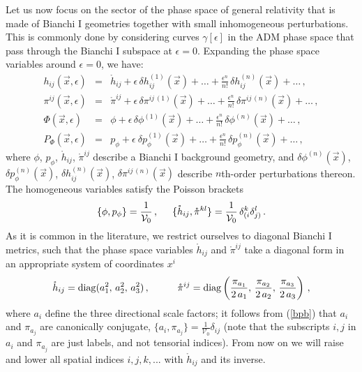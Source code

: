 \documentclass[11pt,tightenlines,eqsecnum,floats,aps,amsmath,amssymb,nofootinbib,prd,floatfix]{revtex4}
\def\f{\frac}
\def\pp{p_{\phi}}
\def\dpp{\delta p_{\phi}}
\def\pz{\mathring{\pi}}
\def\dph{\delta\phi}
\newcommand{\be}{\nopagebreak[3]\begin{equation}}
\newcommand{\ee}{\end{equation}}
\def\hz{\mathring{h}}
\newcommand{\bea}{\nopagebreak[3]\begin{eqnarray}}
\newcommand{\ea}{\end{eqnarray}}
\newcommand{\<}{\langle}
\renewcommand{\>}{\rangle}
\begin{document}
Let us now focus on the sector of the phase space of general relativity that is made of Bianchi I geometries together with small inhomogeneous perturbations. This  is commonly done by considering  curves $\gamma[\epsilon]$ in the ADM  phase space that pass through the Bianchi I subspace at $\epsilon=0$. Expanding the phase space variables around $\epsilon=0$, we have: 
%
\bea \label{expan} h_{ij}(\vec{x},\epsilon) &=& \hz_{ij} + \epsilon\,
\delta h^{(1)}_{ij}(\vec{x}) + \ldots + \f{\epsilon^n}{n!}\, 
\delta h_{ij}^{(n)}(\vec{x}) + \ldots\, ,
\nonumber\\
\pi^{ij}(\vec{x},\epsilon)&=&\pz^{ij}+\epsilon\,
\delta \pi^{ij\, (1)}(\vec{x}) + \ldots + \f{\epsilon^n}{n!}\, 
\delta\pi^{ij\, (n)}(\vec{x}) + \ldots\, , \nonumber \\
\Phi(\vec{x},\epsilon) &=& \phi + \epsilon\, \dph^{(1)}(\vec{x}) + \ldots  + \f{\epsilon^n}{n!}\,\dph^{(n)}(\vec{x}) + \ldots\, , \nonumber \\
P_{\Phi}(\vec{x},\epsilon)&=&\pp+\epsilon\ \dpp^{(1)}(\vec{x})+ \ldots+\f{\epsilon^n}{n!}\,\dpp^{(n)}(\vec{x}) + \ldots\, ,
 \ea
%
where $\phi$, $\pp$, $\hz_{ij}$, $\pz^{ij}$ describe a Bianchi I background geometry,  and $\dph^{(n)}(\vec{x})$, $\dpp^{(n)}(\vec{x})$, $\delta h^{(n)}_{ij}(\vec{x})$, $\delta \pi^{ij\, (n)}(\vec{x})$ describe  $n$th-order perturbations thereon.  The homogeneous variables satisfy the  Poisson brackets
%
\be \label{bpb}  \{\phi, \pp\}=\frac{1}{\mathcal{V}_0}\, ,  \hspace{0.5cm} \{\hz_{ij}, \pz^{kl} \}=\frac{1}{\mathcal{V}_0} \, \delta_{(i}^k\delta_{j)}^{l}\, .\ee 
%
As it is common in the literature, we restrict ourselves to diagonal Bianchi I metrics, such that the phase space variables $\hz_{ij}$ and $\pz^{ij}$ take a diagonal form in an appropriate system of coordinates $x^i$
%
\be \label{back} \hz_{ij}={\rm diag}(a_1^2,\,a_2^2,\,a_3^2) \, ,  \hspace{1cm} \pz^{ij}={\rm diag}\left(\f{\pi_{a_1}}{2\, a_1},\, \f{\pi_{a_2}}{2\, a_2},\, \f{\pi_{a_3}}{2\, a_3}\right)  \, ,\ee
%
where $a_i$ define the three directional scale factors; it follows from (\ref{bpb})  that $a_i$ and $\pi_{a_j}$ are canonically conjugate, $\{a_i,\pi_{a_j}\}=\frac{1}{\mathcal{V}_0} \delta_{ij}$ (note that the subscripts  $i,j$ in $a_i$ and $\pi_{a_j}$ are just labels, and not tensorial indices). From now on we will raise and lower all spatial indices $i,j,k,...$ with  $\hz_{ij}$ and its inverse. 
\end{document}
